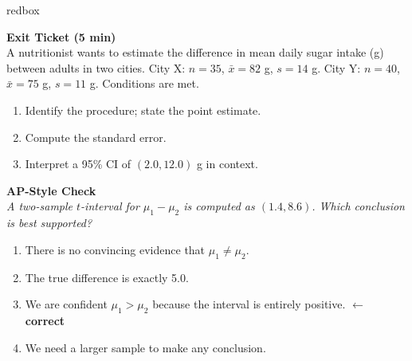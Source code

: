 \documentclass[10pt]{article}
\begin{document}
\begin{skillbox}{redbox}
\begin{minipage}[t]{0.48\linewidth}
    \textbf{Exit Ticket (5 min)}\\
    A nutritionist wants to estimate the difference in mean daily sugar intake (g) between
    adults in two cities. City X: $n = 35$, $\bar x = 82$ g, $s = 14$ g.
    City Y: $n = 40$, $\bar x = 75$ g, $s = 11$ g. Conditions are met.
    \begin{enumerate}
        \item Identify the procedure; state the point estimate.
        \item Compute the standard error.
        \item Interpret a 95\% CI of $(2.0, 12.0)$ g in context.
    \end{enumerate}
\end{minipage}
\hfill
\begin{minipage}[t]{0.48\linewidth}
    \textbf{AP-Style Check}\\
    \textit{A two-sample $t$-interval for $\mu_1 - \mu_2$ is computed as $(1.4, 8.6)$.
    Which conclusion is best supported?}
    \begin{enumerate}[label=(\Alph*)]
        \item There is no convincing evidence that $\mu_1 \ne \mu_2$.
        \item The true difference is exactly 5.0.
        \item We are confident $\mu_1 > \mu_2$ because the interval is entirely positive.
              \textcolor{keyred}{\textbf{$\leftarrow$ correct}}
        \item We need a larger sample to make any conclusion.
    \end{enumerate}
\end{minipage}
\end{skillbox}
\end{document}
